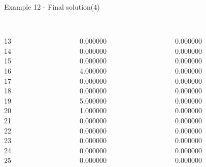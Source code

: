 \begin{frame}{Example 12 - Final solution(4)}
\footnotesize
\begin{columns}[t]
\begin{column}{0.3\textwidth}
\\
13\\
14\\
15\\
16\\
17\\
18\\
19\\
20\\
21\\
22\\
23\\
24\\
25\\
\end{column}
\begin{column}{0.3\textwidth}
\\
0.000000\\
0.000000\\
0.000000\\
4.000000\\
0.000000\\
0.000000\\
5.000000\\
1.000000\\
0.000000\\
0.000000\\
0.000000\\
0.000000\\
0.000000\\
\end{column}  

\begin{column}{0.3\textwidth}
\\
0.000000\\
0.000000\\
0.000000\\
0.000000\\
0.000000\\
0.000000\\
0.000000\\
0.000000\\
0.000000\\
0.000000\\
0.000000\\
0.000000\\
0.000000\\

\end{column}
\end{columns}  
\end{frame}

